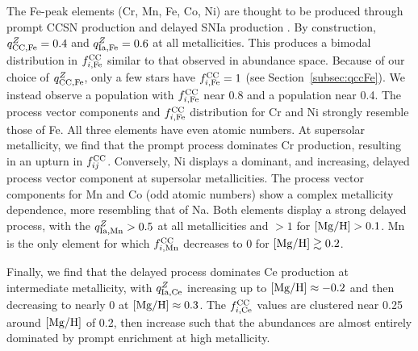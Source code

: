\documentclass[modern, linenumbers]{aastex631}
\newcommand{\mgh}{[{\rm Mg}/{\rm H}]}
\newcommand{\qccFe}{q_{{\rm CC, Fe}}^{Z}}
\newcommand{\qIaFe}{q_{{\rm Ia,Fe}}^{Z}}
\newcommand{\fcc}{f_{ij}^{\rm CC}}
\newcommand{\qIaX}[1]{q_{{\rm Ia, #1}}^{Z}}
\newcommand{\fccX}[1]{f_{i, {\rm #1}}^{\rm CC}}
\begin{document}
The Fe-peak elements (Cr, Mn, Fe, Co, Ni) are thought to be produced through prompt CCSN production and delayed SNIa production \citep[e.g.][]{andrews2017}. By construction, $\qccFe=0.4$ and $\qIaFe=0.6$ at all metallicities. This produces a bimodal distribution in $\fccX{Fe}$ similar to that observed in abundance space. Because of our choice of $\qccFe$, only a few stars have $\fccX{Fe}=1$ (see Section~\ref{subsec:qccFe}). We instead observe a population with $\fccX{Fe}$ near 0.8 and a population near 0.4. The process vector components and $\fccX{Fe}$ distribution for Cr and Ni strongly resemble those of Fe. All three elements have even atomic numbers. At supersolar metallicity, we find that the prompt process dominates Cr production, resulting in an upturn in $\fcc$. Conversely, Ni displays a dominant, and increasing, delayed process vector component at supersolar metallicities. The process vector components for Mn and Co (odd atomic numbers) show a complex metallicity dependence, more resembling that of Na. Both elements display a strong delayed process, with the $\qIaX{Mn} > 0.5$ at all metallicities and $> 1$ for $\mgh > 0.1$. Mn is the only element for which $\fccX{Mn}$ decreases to 0 for $\mgh \gtrsim 0.2$. 

Finally, we find that the delayed process dominates Ce production at intermediate metallicity, with $\qIaX{Ce}$ increasing up to $\mgh \approx -0.2$ and then decreasing to nearly 0 at $\mgh \approx 0.3$. The $\fccX{Ce}$ values are clustered near 0.25 around $\mgh$ of 0.2, then increase such that the abundances are almost entirely dominated by prompt enrichment at high metallicity.
\end{document}
